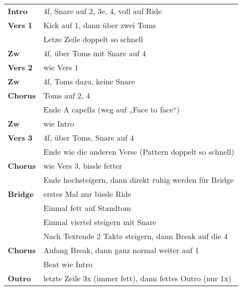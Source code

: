 
\begin{tabular}{p{1.6cm}l}
	\textbf{Intro}  & 4f, Snare auf 2, 3e, 4, voll auf Ride                    \\
	\textbf{Vers 1} & Kick auf 1, dann über zwei Toms                          \\
	                & Letze Zeile doppelt so schnell                           \\
	\textbf{Zw}     & 4f, über Toms mit Snare auf 4                            \\
	\textbf{Vers 2} & wie Vers 1                                               \\
	\textbf{Zw}     & 4f, Toms dazu, keine Snare                               \\
	\textbf{Chorus} & Toms auf 2, 4                                            \\
	                & Ende A capella (weg auf „Face to face“)                  \\
	\textbf{Zw}     & wie Intro                                                \\
	\textbf{Vers 3} & 4f, über Toms, Snare auf 4                               \\
	                & Ende wie die anderen Verse (Pattern doppelt so schnell)  \\
	\textbf{Chorus} & wie Vers 3, bissle fetter                                \\
	                & Ende hochsteigern, dann direkt ruhig werden für Bridge   \\
	\textbf{Bridge} & erstes Mal nur bissle Ride                               \\
	                & Einmal fett auf Standtom                                 \\
	                & Einmal viertel steigern mit Snare                        \\
	                & Nach Textende 2 Takte steigern, dann Break auf die 4     \\
	\textbf{Chorus} & Anfang Break, dann ganz normal weiter auf 1              \\
	                & Beat wie Intro                                           \\
	\textbf{Outro}  & letzte Zeile 3x (immer fett), dann fettes Outro (nur 1x) \\
\end{tabular}
